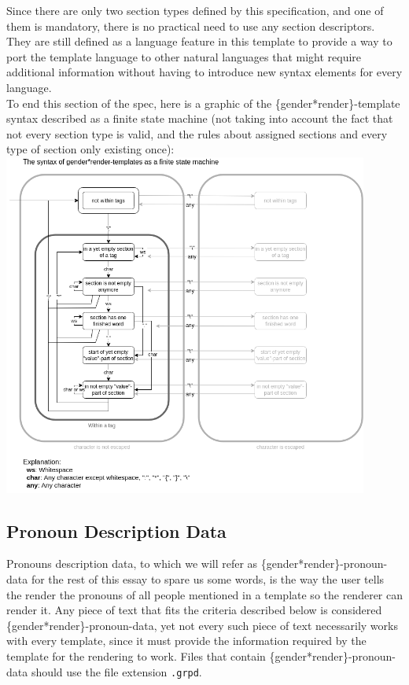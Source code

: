 \documentclass{article}
\begin{document}
    Since there are only two section types defined by this specification, and one of them is mandatory, there is no practical need to use any section descriptors.
    They are still defined as a language feature in this template to provide a way to port the template language to other natural languages that might require additional information without having to introduce new syntax elements for every language.\\

    To end this section of the spec, here is a graphic of the \{gender*render\}-template syntax described as a finite state machine (not taking into account the fact that not every section type is valid, and the rules about assigned sections and every type of section only existing once):\\

    \includegraphics[width=12cm]{images/template-as-finite-state-machine.png}

    \subsection{Pronoun Description Data}

     Pronouns description data, to which we will refer as \{gender*render\}-pronoun-data for the rest of this essay to spare us some words, is the way the user tells the render the pronouns of all people mentioned in a template so the renderer can render it.
     Any piece of text that fits the criteria described below is considered \{gender*render\}-pronoun-data, yet not every such piece of text necessarily works with every template, since it must provide the information required by the template for the rendering to work.
    Files that contain \{gender*render\}-pronoun-data should use the file extension \texttt{.grpd}.\\
\end{document}
